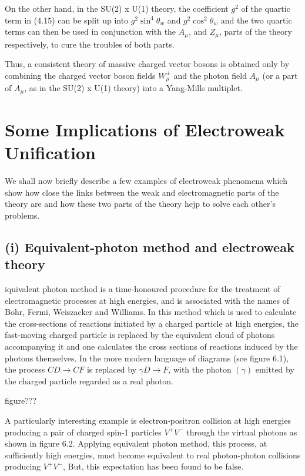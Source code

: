 On the other hand, in the SU(2) x U(1) theory, the coefficient $g^{2}$ of the quartic term in (4.15)
can be split up into $g^{2} \sin^{4} \theta_{w}$ and $g^{2} \cos^{2} \theta_{w}$ and the two quartic terms can then be used in
conjunction with the $A_{\mu}$, and $Z_{\mu}$, parts of the theory respectively, to cure the troubles of both parts. 

Thus, a consistent theory of massive charged vector bosons is obtained only by combining the
charged vector boson fields $W^{\pm}_{\mu}$ and the photon field $A_{\mu}$ (or a part of $A_{\mu}$, as in the SU(2) x U(1)
theory) into a Yang-Mills multiplet. 

\section{Some Implications of Electroweak\\ Unification}

We shall now briefly describe a few examples of electroweak phenomena which show how close
the links between the weak and electromagnetic parts of the theory are and how these two parts
of the theory hejp to solve each other’s problems. 

\subsection*{(i) Equivalent-photon method and electroweak theory}

iquivalent photon method is a time-honoured procedure for the treatment of electromagnetic
processes at high energies, and is associated with the names of Bohr, Fermi, Weiszacker and
Williams. In this method which is used to calculate the cross-sections of reactions initiated by a
charged particle at high energies, the fast-moving charged particle is replaced by the equivalent
cloud of photons accompanying it and one calculates the cross sections of reactions induced by the
photons themselves. In the more modern language of diagrams (sce figure 6.1), the process $CD \rightarrow CF$
is replaced by $\gamma D \rightarrow F$, with the photon $(\gamma)$ emitted by the charged particle regarded as a real photon. 

figure???

A particularly interesting example is electron-positron collision at high energies producing a pair
of charged spin-1 particles $V^{+}V^{-}$ through the virtual photons as shown in figure 6.2. Applying
equivalent photon method, this process, at sufficiently high energies, must become equivalent to
real photon-photon collisions producing $V^{+}V^{-}$, But, this expectation has been found to be false. 

